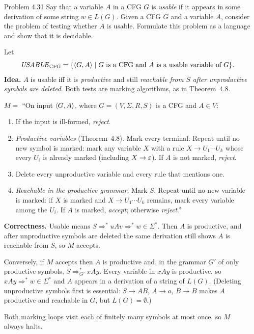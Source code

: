 \begin{question}{Problem 4.31}
Say that a variable $A$ in a CFG $G$ is \emph{usable} if it appears in some derivation of some string $w\in L(G)$. Given a CFG $G$ and a variable $A$, consider the problem of testing whether $A$ is usable. Formulate this problem as a language and show that it is decidable.
\end{question}
\begin{soln}
Let
\[
\mathit{USABLE}_{\mathrm{CFG}}=\{\langle G,A\rangle\mid G\text{ is a CFG and }A\text{ is a usable variable of }G\}.
\]
\textbf{Idea.} $A$ is usable iff it is \emph{productive} and still \emph{reachable from $S$ after unproductive symbols are deleted}. Both tests are marking algorithms, as in Theorem~4.8.

$M=$ ``On input $\langle G,A\rangle$, where $G=(V,\Sigma,R,S)$ is a CFG and $A\in V$:
\begin{enumerate}
\item If the input is ill-formed, \emph{reject}.
\item \emph{Productive variables} (Theorem~4.8). Mark every terminal. Repeat until no new symbol is marked: mark any variable $X$ with a rule $X\to U_1\cdots U_k$ whose every $U_i$ is already marked (including $X\to\varepsilon$). If $A$ is not marked, \emph{reject}.
\item Delete every unproductive variable and every rule that mentions one.
\item \emph{Reachable in the productive grammar.} Mark $S$. Repeat until no new variable is marked: if $X$ is marked and $X\to U_1\cdots U_k$ remains, mark every variable among the $U_i$. If $A$ is marked, \emph{accept}; otherwise \emph{reject}.''
\end{enumerate}

\textbf{Correctness.} Usable means $S\Rightarrow^* uAv\Rightarrow^* w\in\Sigma^*$. Then $A$ is productive, and after unproductive symbols are deleted the same derivation still shows $A$ is reachable from $S$, so $M$ accepts.

Conversely, if $M$ accepts then $A$ is productive and, in the grammar $G'$ of only productive symbols, $S\Rightarrow_{G'}^* xAy$. Every variable in $xAy$ is productive, so $xAy\Rightarrow^* w\in\Sigma^*$ and $A$ appears in a derivation of a string of $L(G)$. (Deleting unproductive symbols first is essential: $S\to AB$, $A\to a$, $B\to B$ makes $A$ productive and reachable in $G$, but $L(G)=\emptyset$.)

Both marking loops visit each of finitely many symbols at most once, so $M$ always halts.
\end{soln}

